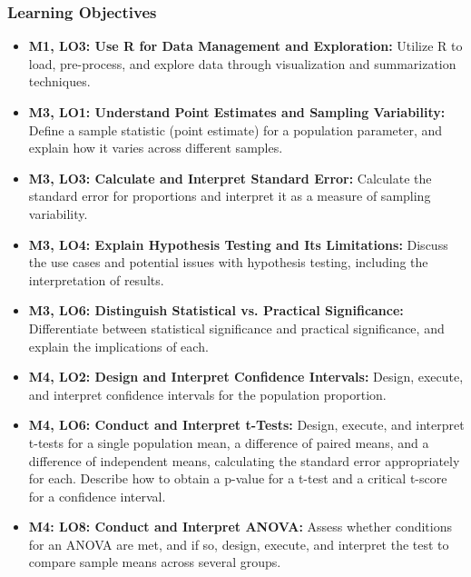 \begin{frame}
    \frametitle{Learning Objectives}
    \begin{itemize}
        \item \textbf{M1, LO3: Use R for Data Management and Exploration:} Utilize R to load, pre-process, and explore data through visualization and summarization techniques.
        \item \textbf{M3, LO1: Understand Point Estimates and Sampling Variability:} Define a sample statistic (point estimate) for a population parameter, and explain how it varies across different samples.
        \item \textbf{M3, LO3: Calculate and Interpret Standard Error:} Calculate the standard error for proportions and interpret it as a measure of sampling variability.
        \item \textbf{M3, LO4: Explain Hypothesis Testing and Its Limitations:} Discuss the use cases and potential issues with hypothesis testing, including the interpretation of results.
        \item \textbf{M3, LO6: Distinguish Statistical vs. Practical Significance:} Differentiate between statistical significance and practical significance, and explain the implications of each.
        \item \textbf{M4, LO2: Design and Interpret Confidence Intervals:} Design, execute, and interpret confidence intervals for the population proportion.
        \item \textbf{M4, LO6: Conduct and Interpret t-Tests:} Design, execute, and interpret t-tests for a single population mean, a difference of paired means, and a difference of independent means, calculating the standard error appropriately for each. Describe how to obtain a p-value for a t-test and a critical t-score for a confidence interval.    
        \item \textbf{M4: LO8: Conduct and Interpret ANOVA:} Assess whether conditions for an ANOVA are met, and if so, design, execute, and interpret the test to compare sample means across several groups.
    \end{itemize}
\end{frame}
    

